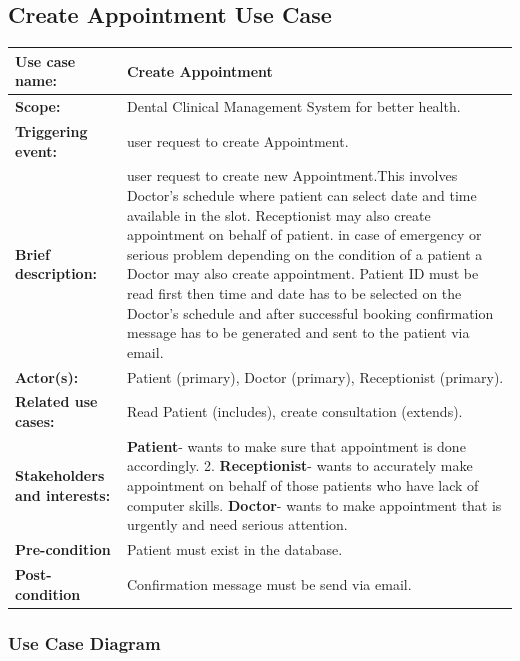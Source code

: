 \documentclass[11 pt]{article}
\begin{document}
\subsection{Create Appointment Use Case}
\begin{tabular}{|p{3cm}|p{9cm}|}
\hline
\textbf{Use case name:}& Create Appointment\\
\hline
\textbf{Scope:}& Dental Clinical Management System for better health.\\
\hline
\textbf{Triggering event:}& user request to create Appointment.\\
\hline
\textbf{Brief description:}& user request to create new Appointment.This involves Doctor's schedule where patient can select date and time available in the slot. Receptionist may also create appointment on behalf of patient. in case of emergency or serious problem depending on the condition of a patient a Doctor may also create appointment. Patient ID must be read first then time and date has to be selected on the Doctor's schedule and after successful booking confirmation message has to be generated and sent to the patient via email.    \\
\hline
\textbf{Actor(s):}& Patient (primary), Doctor (primary), Receptionist (primary).\\
\hline
\textbf{Related use cases:}& Read Patient (includes), create consultation (extends).\\
\hline
\textbf{Stakeholders and interests:}& \textbf{Patient}- wants to make sure that appointment is done accordingly. 2. \textbf{Receptionist}- wants to accurately make appointment on behalf of those patients who have lack of computer skills. \textbf{Doctor}- wants to make appointment that is urgently and need serious attention. \\
\hline
\textbf{Pre-condition}& Patient must exist in the database.\\
\hline
\textbf{Post-condition}& Confirmation message must be send via email.\\
\hline
\end{tabular}
\newpage
\subsubsection{Use Case Diagram}
\end{document}
